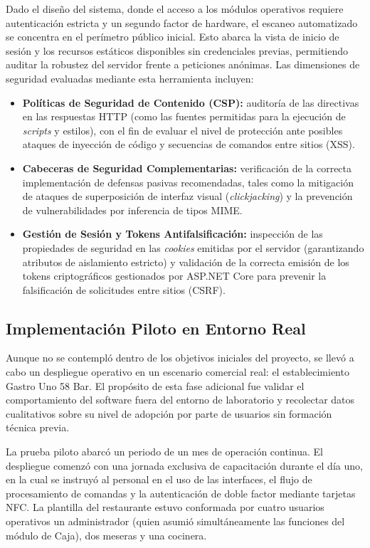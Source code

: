 Dado el diseño del sistema, donde el acceso a los módulos operativos requiere autenticación estricta y un segundo factor de hardware, el escaneo automatizado se concentra en el perímetro público inicial. Esto abarca la vista de inicio de sesión y los recursos estáticos disponibles sin credenciales previas, permitiendo auditar la robustez del servidor frente a peticiones anónimas. Las dimensiones de seguridad evaluadas mediante esta herramienta incluyen:

\begin{itemize}
	\item \textbf{Políticas de Seguridad de Contenido (CSP):} auditoría de las directivas en las respuestas HTTP (como las fuentes permitidas para la ejecución de \textit{scripts} y estilos), con el fin de evaluar el nivel de protección ante posibles ataques de inyección de código y secuencias de comandos entre sitios (XSS).
	\item \textbf{Cabeceras de Seguridad Complementarias:} verificación de la correcta implementación de defensas pasivas recomendadas, tales como la mitigación de ataques de superposición de interfaz visual (\textit{clickjacking}) y la prevención de vulnerabilidades por inferencia de tipos MIME.
	\item \textbf{Gestión de Sesión y Tokens Antifalsificación:} inspección de las propiedades de seguridad en las \textit{cookies} emitidas por el servidor (garantizando atributos de aislamiento estricto) y validación de la correcta emisión de los tokens criptográficos gestionados por ASP.NET Core para prevenir la falsificación de solicitudes entre sitios (CSRF).
\end{itemize}

\subsection{Implementación Piloto en Entorno Real}
\label{subsec:piloto}

Aunque no se contempló dentro de los objetivos iniciales del proyecto, se llevó a cabo
un despliegue operativo en un escenario comercial real: el establecimiento Gastro Uno 58 Bar.
El propósito de esta fase adicional fue validar el comportamiento del software fuera del
entorno de laboratorio y recolectar datos cualitativos sobre su nivel de adopción por parte
de usuarios sin formación técnica previa.

La prueba piloto abarcó un periodo de un mes de operación continua. El despliegue comenzó
con una jornada exclusiva de capacitación durante el día uno, en la cual se instruyó al
personal en el uso de las interfaces, el flujo de procesamiento de comandas y la autenticación
de doble factor mediante tarjetas NFC. La plantilla del restaurante estuvo conformada por cuatro usuarios operativos un administrador (quien asumió simultáneamente las funciones del módulo de Caja), dos meseras y una cocinera.

